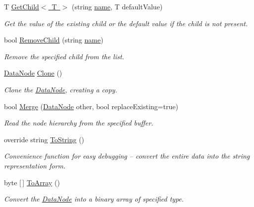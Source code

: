 \begin{DoxyCompactItemize}
T \mbox{\hyperlink{class_t_net_1_1_data_node_a557421fb2b9b29bb88f2d5ae83a2f145}{Get\+Child$<$ T $>$}} (string \mbox{\hyperlink{class_t_net_1_1_data_node_aaf44a44fb25aad98dd115faf7607858c}{name}}, T default\+Value)
\begin{DoxyCompactList}\small\item\em Get the value of the existing child or the default value if the child is not present. \end{DoxyCompactList}\item 
bool \mbox{\hyperlink{class_t_net_1_1_data_node_a7dc59562ed15384020ade6799fde0fcc}{Remove\+Child}} (string \mbox{\hyperlink{class_t_net_1_1_data_node_aaf44a44fb25aad98dd115faf7607858c}{name}})
\begin{DoxyCompactList}\small\item\em Remove the specified child from the list. \end{DoxyCompactList}\item 
\mbox{\hyperlink{class_t_net_1_1_data_node}{Data\+Node}} \mbox{\hyperlink{class_t_net_1_1_data_node_ab1e844adb5b3c40e3a1b62519045ca45}{Clone}} ()
\begin{DoxyCompactList}\small\item\em Clone the \mbox{\hyperlink{class_t_net_1_1_data_node}{Data\+Node}}, creating a copy. \end{DoxyCompactList}\item 
bool \mbox{\hyperlink{class_t_net_1_1_data_node_a4edda6eca33ee5c14a2d4d0c9d3473ad}{Merge}} (\mbox{\hyperlink{class_t_net_1_1_data_node}{Data\+Node}} other, bool replace\+Existing=true)
\begin{DoxyCompactList}\small\item\em Read the node hierarchy from the specified buffer. \end{DoxyCompactList}\item 
override string \mbox{\hyperlink{class_t_net_1_1_data_node_ad8aa51ff34bafbbc04d1c366f143784a}{To\+String}} ()
\begin{DoxyCompactList}\small\item\em Convenience function for easy debugging -- convert the entire data into the string representation form. \end{DoxyCompactList}\item 
byte \mbox{[}$\,$\mbox{]} \mbox{\hyperlink{class_t_net_1_1_data_node_a1c32b63d37a41d31b69aa41c5aa8ba2c}{To\+Array}} ()
\begin{DoxyCompactList}\small\item\em Convert the \mbox{\hyperlink{class_t_net_1_1_data_node}{Data\+Node}} into a binary array of specified type. \end{DoxyCompactList}\end{DoxyCompactItemize}
